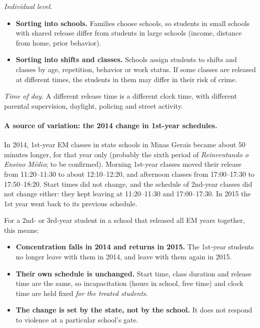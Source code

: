 \emph{Individual level.}
\begin{itemize}
  \item \textbf{Sorting into schools.} Families choose schools, so students in
        small schools with shared release differ from students in large
        schools (income, distance from home, prior behavior).
  \item \textbf{Sorting into shifts and classes.} Schools assign students to
        shifts and classes by age, repetition, behavior or work status. If
        some classes are released at different times, the students in them may
        differ in their risk of crime.
\end{itemize}

\emph{Time of day.} A different release time is a different clock time, with
different parental supervision, daylight, policing and street activity.

\paragraph{A source of variation: the 2014 change in 1st-year schedules.} In
2014, 1st-year EM classes in state schools in Minas Gerais became about
50 minutes longer, for that year only (probably the sixth period of
\emph{Reinventando o Ensino M\'edio}; to be confirmed). Morning 1st-year classes
moved their release from 11:20--11:30 to about 12:10--12:20, and afternoon
classes from 17:00--17:30 to 17:50--18:20. Start times did not change, and the
schedule of 2nd-year classes did not change either: they kept leaving at
11:20--11:30 and 17:00--17:30. In 2015 the 1st year went back to its previous
schedule.

For a 2nd- or 3rd-year student in a school that released all EM years
together, this means:
\begin{itemize}
  \item \textbf{Concentration falls in 2014 and returns in 2015.} The 1st-year
        students no longer leave with them in 2014, and leave with them again
        in 2015.
  \item \textbf{Their own schedule is unchanged.} Start time, class duration
        and release time are the same, so incapacitation (hours in school,
        free time) and clock time are held fixed \emph{for the treated
        students}.
  \item \textbf{The change is set by the state, not by the school.} It does not
        respond to violence at a particular school's gate.
\end{itemize}

